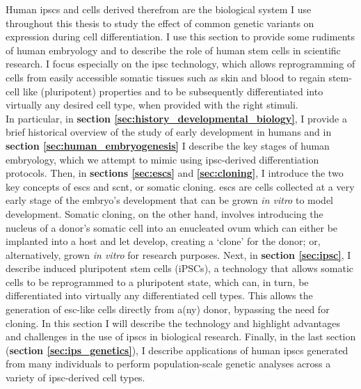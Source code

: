Human \glspl{ipsc} and cells derived therefrom are the biological system I use throughout this thesis to study the effect of common genetic variants on expression during cell differentiation.
I use this section to provide some rudiments of human embryology and to describe the role of human stem cells in scientific research.
I focus especially on the \gls{ipsc} technology, which allows reprogramming of cells from easily accessible somatic tissues such as skin and blood to regain stem-cell like (pluripotent) properties and to be subsequently differentiated into virtually any desired cell type, when provided with the right stimuli.\\

In particular, in \textbf{section \ref{sec:history_developmental_biology}}, I provide a brief historical overview of the study of early development in humans and in \textbf{section \ref{sec:human_embryogenesis}} I describe the key stages of human embryology, which we attempt to mimic using \gls{ipsc}-derived differentiation protocols.
Then, in \textbf{sections \ref{sec:escs}} and \textbf{\ref{sec:cloning}}, I introduce the two key concepts of \glspl{esc} and \gls{scnt}, or somatic cloning.
\glspl{esc} are cells collected at a very early stage of the embryo's development that can be grown \textit{in vitro} to model development.
Somatic cloning, on the other hand, involves introducing the nucleus of a donor's somatic cell into an enucleated ovum which can either be implanted into a host and let develop, creating a `clone' for the donor; or, alternatively, grown \textit{in vitro} for research purposes.
Next, in \textbf{section \ref{sec:ipsc}}, I describe induced pluripotent stem cells (iPSCs), a technology that allows somatic cells to be reprogrammed to a pluripotent state, which can, in turn, be differentiated into virtually any
differentiated cell types.
This allows the generation of \gls{esc}-like cells directly from a(ny) donor, bypassing the need for cloning. 
In this section I will describe the technology and highlight advantages and challenges in the use of \glspl{ipsc} in biological research.
Finally, in the last section (\textbf{section \ref{sec:ips_genetics}}), I describe 
applications of human \glspl{ipsc} generated from many individuals to perform population-scale genetic analyses across a variety of \gls{ipsc}-derived cell types.


